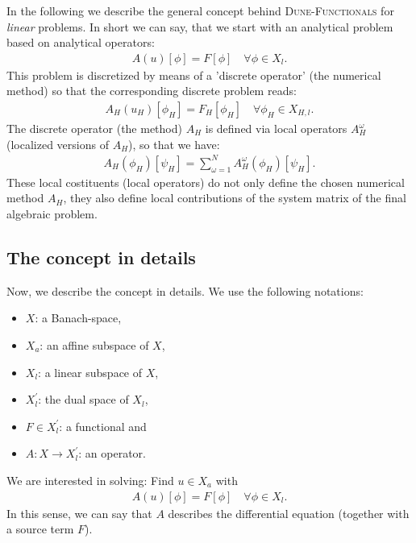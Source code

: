 \documentclass[a4paper,11pt]{article}
\numberwithin{equation}{section}
\newcommand{\dunefunctionals}{\textsc{Dune-Functionals}\xspace}
\begin{document}
In the following we describe the general concept behind \dunefunctionals for {\it linear} problems. In short we can say, that we start with an analytical problem based on analytical operators:
\begin{align*}
A(u)[\phi] = F[\phi] \quad \forall \phi \in X_l.
\end{align*}
This problem is discretized by means of a 'discrete operator' (the numerical method) so that the corresponding discrete problem reads:
\begin{align*}
A_H(u_H)[\phi_H] = F_H[\phi_H] \quad \forall \phi_H \in X_{H,l}.
\end{align*}
The discrete operator (the method) $A_H$ is defined via local operators $A_H^{\omega}$ (localized versions of $A_H$), so that we have:
\begin{align*}
A_H(\phi_H)[\psi_H] = \sum_{\omega =1}^N A_H^{\omega}(\phi_H)[\psi_H].
\end{align*}
These local costituents (local operators) do not only define the chosen numerical method $A_H$, they also define local contributions of the system matrix of the final algebraic problem. 

\subsection{The concept in details}

Now, we describe the concept in details. We use the following notations:
\begin{itemize}
 \item $X$: a Banach-space,
 \item $X_a$: an affine subspace of $X$,
 \item $X_l$: a linear subspace of $X$,
 \item $X^{\prime}_l$: the dual space of $X_l$,
 \item $F \in X_l^{\prime}$: a functional and
 \item $A : X \rightarrow X_l^{\prime}$: an operator.
\end{itemize}
We are interested in solving: Find $u \in X_a$ with
\begin{align}
\label{original-problem} A(u)[\phi] = F[\phi] \quad \forall \phi \in X_l.
\end{align}
In this sense, we can say that $A$ describes the differential equation (together with a source term $F$).
\end{document}
